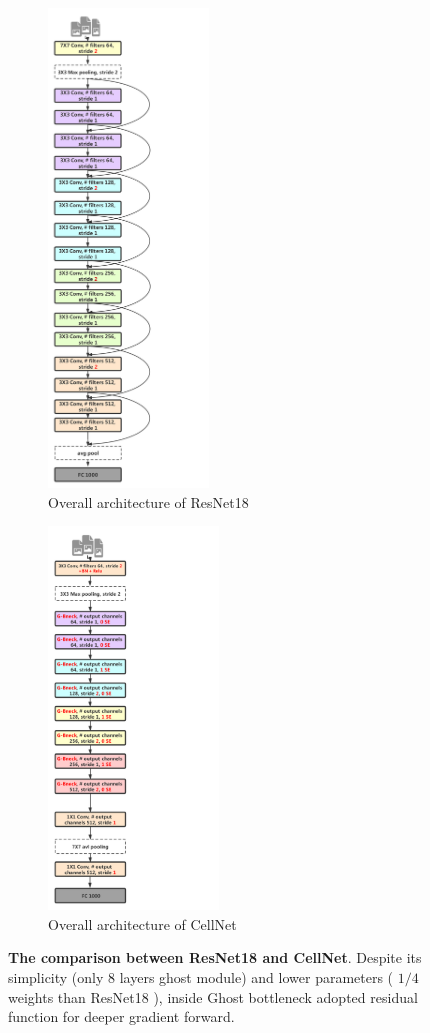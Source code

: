 \begin{figure}[h]
	\begin{center}
		\begin{subfigure}[t]{0.49\textwidth}
		    \centering
			\includegraphics[height=5in]{thesis-template-master/images/res18.pdf}
			\caption{Overall architecture of ResNet18}
			\label{fig:res18}
		\end{subfigure}
		\begin{subfigure}[t]{0.49\textwidth}
		    \centering
			\includegraphics[height =4in]{thesis-template-master/images/Ghostres18.pdf}
			\caption{Overall architecture of CellNet}
			\label{fig:cellnet}
		\end{subfigure}
	\end{center}
	\caption{\textbf{The comparison between ResNet18 \cite{b20} and CellNet}. Despite its simplicity (only 8 layers ghost module) and lower parameters ( $1/4$ weights than ResNet18 \cite{b20}), inside Ghost bottleneck adopted residual function for deeper gradient forward.}
\end{figure}








